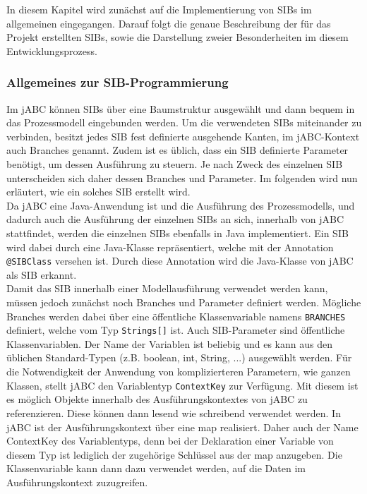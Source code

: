 
In diesem Kapitel wird zunächst auf die Implementierung von SIBs im allgemeinen eingegangen. Darauf folgt die genaue Beschreibung der für das Projekt erstellten SIBs, sowie die Darstellung zweier Besonderheiten im diesem Entwicklungsprozess.

\subsubsection{Allgemeines zur SIB-Programmierung}
Im jABC können SIBs über eine Baumstruktur ausgewählt und dann bequem in das Prozessmodell eingebunden werden. Um die verwendeten SIBs miteinander zu verbinden, besitzt jedes SIB fest definierte ausgehende Kanten, im jABC-Kontext auch Branches genannt. Zudem ist es üblich, dass ein SIB definierte Parameter benötigt, um dessen Ausführung zu steuern. Je nach Zweck des einzelnen SIB unterscheiden sich daher dessen Branches und Parameter. Im folgenden wird nun erläutert, wie ein solches SIB erstellt wird.\\

Da jABC eine Java-Anwendung ist und die Ausführung des Prozessmodells, und dadurch auch die Ausführung der einzelnen SIBs an sich, innerhalb von jABC stattfindet, werden die einzelnen SIBs ebenfalls in Java implementiert. Ein SIB wird dabei durch eine Java-Klasse repräsentiert, welche mit der Annotation \texttt{@SIBClass} versehen ist. Durch diese Annotation wird die Java-Klasse von jABC als SIB erkannt.\\

Damit das SIB innerhalb einer Modellausführung verwendet werden kann, müssen jedoch zunächst noch Branches und Parameter definiert werden. Mögliche Branches werden dabei über eine öffentliche Klassenvariable namens \texttt{BRANCHES} definiert, welche vom Typ \texttt{Strings[]} ist. Auch SIB-Parameter sind öffentliche Klassenvariablen. Der Name der Variablen ist beliebig und es kann aus den üblichen Standard-Typen (z.B. boolean, int, String, ...) ausgewählt werden. Für die Notwendigkeit der Anwendung von komplizierteren Parametern, wie ganzen Klassen, stellt jABC den Variablentyp \texttt{ContextKey} zur Verfügung. Mit diesem ist es möglich Objekte innerhalb des Ausführungskontextes von jABC zu referenzieren. Diese können dann lesend wie schreibend verwendet werden. In jABC ist der Ausführungskontext über eine map realisiert. Daher auch der Name ContextKey des Variablentyps, denn bei der Deklaration einer Variable von diesem Typ ist lediglich der zugehörige Schlüssel aus der map anzugeben. Die Klassenvariable kann dann dazu verwendet werden, auf die Daten im Ausführungskontext zuzugreifen. \\

